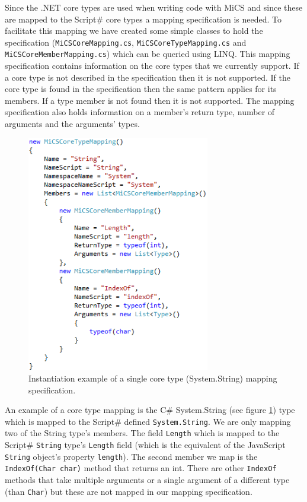 			Since the .NET core types are used when writing code with MiCS and since these are mapped to the Script\# core types a mapping specification is needed. To facilitate this mapping we have created some simple classes to hold the specification (\texttt{MiCSCoreMapping.cs}, \texttt{MiCSCoreTypeMapping.cs} and \texttt{MiCSCoreMemberMapping.cs}) which can be queried using LINQ. This mapping specification contains information on the core types that we currently support. If a core type is not described in the specification then it is not supported. If the core type is found in the specification then the same pattern applies for its members. If a type member is not found then it is not supported. The mapping specification also holds information on a member’s return type, number of arguments and the arguments’ types.

			\begin{figure}[H]
					\includegraphics[width=8cm]{resources/images/InitiationOfTypeMapping.png}
				\caption{Instantiation example of a single core type (System.String) mapping specification.}
				\label{coreTypeMapping}
			\end{figure}

			An example of a core type mapping is the C\# System.String (see figure \ref{coreTypeMapping}) type which is mapped to the Script\# defined \texttt{System.String}. We are only mapping two of the String type’s members. The field \texttt{Length} which is mapped to the Script\# \texttt{String} type’s \texttt{Length} field (which is the equivalent of the JavaScript \texttt{String} object's property \texttt{length}). The second member we map is the \texttt{IndexOf(Char char)} method that returns an int. There are other \texttt{IndexOf} methods that take multiple arguments or a single argument of a different type (than \texttt{Char}) but these are not mapped in our mapping specification.

